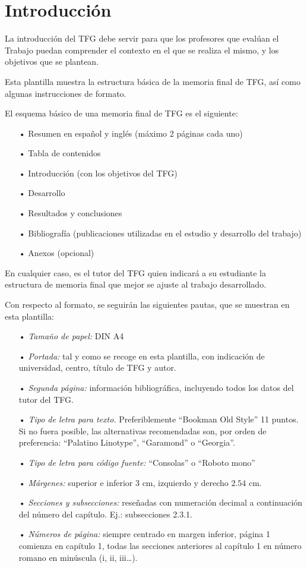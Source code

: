 \chapter{Introducción}
La introducción del TFG debe servir para que los profesores que evalúan el Trabajo puedan comprender el contexto en el que se realiza el mismo, y los objetivos que se plantean.

Esta plantilla muestra la estructura básica de la memoria final de TFG, así como algunas instrucciones de formato.

El esquema básico de una memoria final de TFG es el siguiente:
\begin{itemize}
    \item[•] Resumen en español y inglés (máximo 2 páginas cada uno)
    \item[•] Tabla de contenidos
    \item[•] Introducción (con los objetivos del TFG)
    \item[•] Desarrollo
    \item[•] Resultados y conclusiones
    \item[•] Bibliografía (publicaciones utilizadas en el estudio y desarrollo del trabajo)
    \item[•] Anexos (opcional)
\end{itemize}

En cualquier caso, es el tutor del TFG quien indicará a su estudiante la estructura de memoria final que mejor se ajuste al trabajo desarrollado.

Con respecto al formato, se seguirán las siguientes pautas, que se muestran en esta plantilla:
\begin{itemize}
    \item[•] \textit{Tamaño de papel:} DIN A4
    \item[•] \textit{Portada:} tal y como se recoge en esta plantilla, con indicación de universidad, centro, título de TFG y autor.
    \item[•] \textit{Segunda página:} información bibliográfica, incluyendo todos los datos del tutor del TFG.
    \item[•] \textit{Tipo de letra para texto.} Preferiblemente “Bookman Old Style” 11 puntos. Si no fuera posible, las alternativas recomendadas son, por orden de preferencia: “Palatino Linotype”, “Garamond” o “Georgia”.
    \item[•] \textit{Tipo de letra para código fuente:} “Consolas” o “Roboto mono”
    \item[•] \textit{Márgenes:} superior e inferior $3$ cm, izquierdo y derecho $2.54$ cm.
    \item[•] \textit{Secciones y subsecciones:} reseñadas con numeración decimal a continuación del número del capítulo. Ej.: subsecciones 2.3.1.
    \item[•] \textit{Números de página:} siempre centrado en margen inferior, página 1 comienza en capítulo 1, todas las secciones anteriores al capítulo 1 en número romano en minúscula (i, ii, iii…).
\end{itemize}

